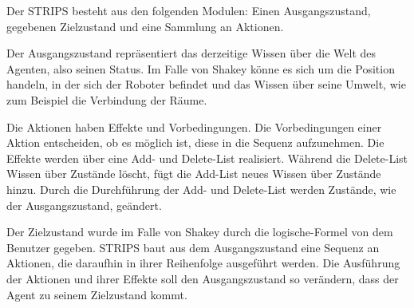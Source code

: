 Der STRIPS besteht aus den folgenden Modulen: Einen Ausgangszustand, gegebenen Zielzustand und eine Sammlung an Aktionen.

Der Ausgangszustand repr\"{a}sentiert das derzeitige Wissen \"{u}ber die Welt des Agenten, also seinen Status. Im Falle von Shakey k\"{o}nne es sich um die Position handeln, in der sich der Roboter befindet und das Wissen \"{u}ber seine Umwelt, wie zum Beispiel die Verbindung der R\"{a}ume.

Die Aktionen haben Effekte und Vorbedingungen. Die Vorbedingungen einer Aktion entscheiden, ob es m\"{o}glich ist, diese in die Sequenz aufzunehmen. Die Effekte werden \"{u}ber eine Add- und Delete-List realisiert. W\"{a}hrend die Delete-List Wissen \"{u}ber Zust\"{a}nde l\"{o}scht, f\"{u}gt die Add-List neues Wissen \"{u}ber Zust\"{a}nde hinzu. Durch die Durchf\"{u}hrung der Add- und Delete-List werden Zust\"{a}nde, wie der Ausgangszustand, ge\"{a}ndert.

Der Zielzustand wurde im Falle von Shakey durch die logische-Formel von dem Benutzer gegeben. STRIPS baut aus dem Ausgangszustand eine Sequenz an Aktionen, die daraufhin in ihrer Reihenfolge ausgef\"{u}hrt werden. Die Ausf\"{u}hrung der Aktionen und ihrer Effekte soll den Ausgangszustand so ver\"{a}ndern, dass der Agent zu seinem Zielzustand kommt.

